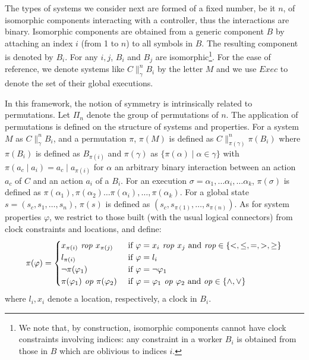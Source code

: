 \documentclass{LMCS}
\newcommand{\cn}{\mathit{B}\xspace}
\newcommand{\ctrl}{C}
\newcommand{\exg}{Exec}
\theoremstyle{plain}\newtheorem{remark}[thm]{Remark}
\theoremstyle{plain}\newtheorem{example}[thm]{Example}
\begin{document}
The types of systems we consider next are formed of a fixed number, be
it $n$, of isomorphic components interacting with a controller, thus
the interactions are binary. Isomorphic components are obtained from a
generic component $\cn$ by attaching an index $i$ (from 1 to $n$) to
all symbols in $\cn$. The resulting component is denoted by
$B_i$. For any $i, j$, $\cn_i$ and $\cn_j$ are
isomorphic\footnote{We note that, by construction, isomorphic
  components cannot have clock constraints involving indices: any
  constraint in a worker $\cn_i$ is obtained from those in $\cn$
  which are oblivious to indices $i$.}. For the ease of reference, we
denote systems like $\ctrl \|^n_{\gamma} \cn_i$ by the letter $M$ and
we use $\exg$ to denote the set of their global executions.

In this framework, the notion of symmetry is intrinsically related to
permutations.  Let $\Pi_n$ denote the group of permutations of $n$.
The application of permutations is defined on the structure of systems
and properties.  For a system $M$ as $\ctrl \|^n_{\gamma} \cn_i$,
and a permutation $\pi$, $\pi(M)$ is defined as $\ctrl
\|^n_{\pi(\gamma)} \pi(\cn_i)$ where $\pi(\cn_i)$ is defined as
$\cn_{\pi(i)}$ and $\pi(\gamma)$ as $\{\pi(\alpha) \mid \alpha \in
\gamma\}$ with $\pi(a_c\mid a_i) = a_c \mid a_{\pi(i)}$ for $\alpha$
an arbitrary binary interaction between an action $a_c$ of $\ctrl$ and
an action $a_i$ of a $B_i$. For an execution $\sigma = \alpha_1, \dots
\alpha_i, \dots \alpha_k$, $\pi(\sigma)$ is defined as $\pi(\alpha_1),
\pi(\alpha_2) \dots \pi(\alpha_i), \dots, \pi(\alpha_k)$. For a global
state $s = (s_c, s_1, \dots, s_n)$, $\pi(s)$ is defined as $(s_c,
s_{\pi(1)}, \dots, s_{\pi(n)})$.  As for system properties $\varphi$, we
restrict to those built (with the usual logical connectors) from clock
constraints and locations, and define:
\[
\pi(\varphi) = 
\begin{cases}
   x_{\pi(i)} \textit{ rop } x_{\pi(j)} & \textup{ if } \varphi = x_i \textit{ rop } x_j \textup{ and } \textit{rop} \in \{<,\leq,=,>, \geq\}\\
  l_{\pi(i)} & \textup{ if } \varphi = l_i \\
  \neg \pi(\varphi_1) & \textup{ if } \varphi = \neg \varphi_1 \\
  \pi(\varphi_1) \textit{ op } \pi(\varphi_2) & \textup{ if } \varphi = \varphi_1 \textit{ op } \varphi_2 \textup{ and } \mathit{op} \in \{\wedge, \vee\}
\end{cases}
\]
where $l_i, x_i$ denote a location, respectively, a clock in $B_i$.
\end{document}
